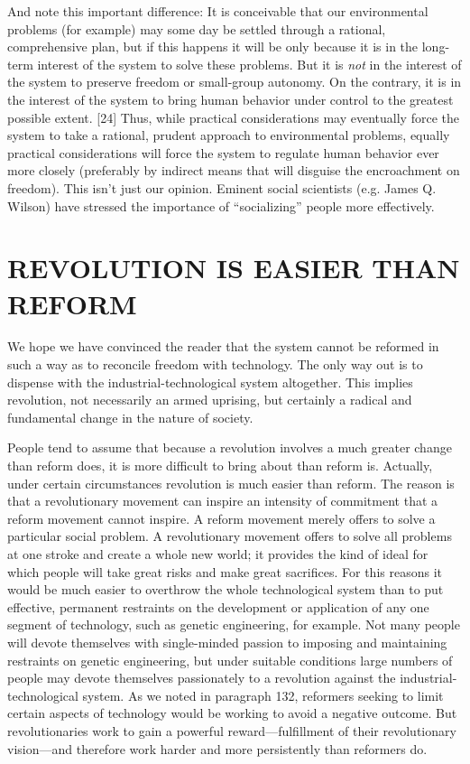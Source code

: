  And note this important difference: It is conceivable that our environmental problems (for example) may some day be settled through a rational, comprehensive plan, but if this happens it will be only because it is in the long-term interest of the system to solve these problems. But it is {\em not} in the interest of the system to preserve freedom or small-group autonomy. On the contrary, it is in the interest of the system to bring human behavior under control to the greatest possible extent. [24] Thus, while practical considerations may eventually force the system to take a rational, prudent approach to environmental problems, equally practical considerations will force the system to regulate human behavior ever more closely (preferably by indirect means that will disguise the encroachment on freedom). This isn’t just our opinion. Eminent social scientists (e.g. James Q. Wilson) have stressed the importance of “socializing” people more effectively.

\chapter{REVOLUTION IS EASIER THAN REFORM}

 We hope we have convinced the reader that the system cannot be reformed in such a way as to reconcile freedom with technology. The only way out is to dispense with the industrial-technological system altogether. This implies revolution, not necessarily an armed uprising, but certainly a radical and fundamental change in the nature of society.

 People tend to assume that because a revolution involves a much greater change than reform does, it is more difficult to bring about than reform is. Actually, under certain circumstances revolution is much easier than reform. The reason is that a revolutionary movement can inspire an intensity of commitment that a reform movement cannot inspire. A reform movement merely offers to solve a particular social problem. A revolutionary movement offers to solve all problems at one stroke and create a whole new world; it provides the kind of ideal for which people will take great risks and make great sacrifices. For this reasons it would be much easier to overthrow the whole technological system than to put effective, permanent restraints on the development or application of any one segment of technology, such as genetic engineering, for example. Not many people will devote themselves with single-minded passion to imposing and maintaining restraints on genetic engineering, but under suitable conditions large numbers of people may devote themselves passionately to a revolution against the industrial-technological system. As we noted in paragraph 132, reformers seeking to limit certain aspects of technology would be working to avoid a negative outcome. But revolutionaries work to gain a powerful reward—fulfillment of their revolutionary vision—and therefore work harder and more persistently than reformers do.

